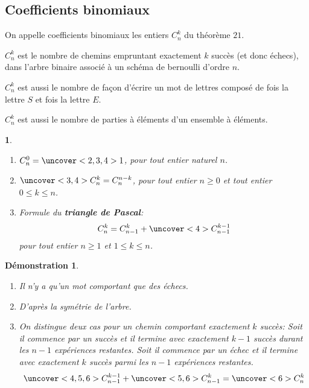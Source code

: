 \documentclass{beamer}
\newtheorem{proposition}[theorem]{\translate{Proposition}}
\newtheorem{demonstration}[theorem]{Démonstration}
\begin{document}
\subsection{Coefficients binomiaux}

\begin{frame}
\begin{definition}
 On appelle coefficients binomiaux les entiers $C_n^k$ du théorème $21$.
 
 $C_n^k$ est le nombre de chemins empruntant exactement $k$ succès (et donc 
  échecs),
 dans l'arbre binaire associé à un schéma de bernoulli d'ordre $n$.
 
 $C_n^k$ est aussi le nombre de façon d'écrire un mot de 
  lettres composé de  fois la 
 lettre $S$ et  fois la lettre $E$.
 
 $C_n^k$ est aussi le nombre de parties à  éléments d'un ensemble à 
  éléments.
\end{definition}
\end{frame}

\begin{frame}
 \begin{proposition}
  \begin{enumerate}
   \item $C_n^0=\uncover<2,3,4>{1}$, pour tout entier naturel $n$.
   \item $\uncover<3,4>{C_n^k}=C_n^{n-k}$, pour tout entier $n \geq 0$ et tout entier $0\leq k \leq n$. 
   \item Formule du \textbf{triangle de Pascal}:
   $$C_n^k=C_{n-1}^k+\uncover<4>{C_{n-1}^{k-1}}$$ pour tout entier $n \geq 1$ et $1 \leq k \leq n$.
  \end{enumerate}

 \end{proposition}
 \end{frame}
 
 \begin{frame}
 \begin{demonstration}
 
 \begin{enumerate}
   \item Il n'y a qu'un mot comportant que des échecs.
   \item D'après la symétrie de l'arbre. 
   \item On distingue deux cas pour un chemin comportant exactement $k$
   succès: Soit il commence par un succès et il termine avec exactement $k-1$ succès durant les
   $n-1$ expériences restantes. Soit il commence par un échec et il termine avec exactement $k$ succès
   parmi les $n-1$ expériences restantes.
   $$\uncover<4,5,6>{C_{n-1}^{k-1}}+\uncover<5,6>{C_{n-1}^{k}}=\uncover<6>{C_n^k}$$
  \end{enumerate}
  
 \end{demonstration}


\end{frame}



 
\end{document}
